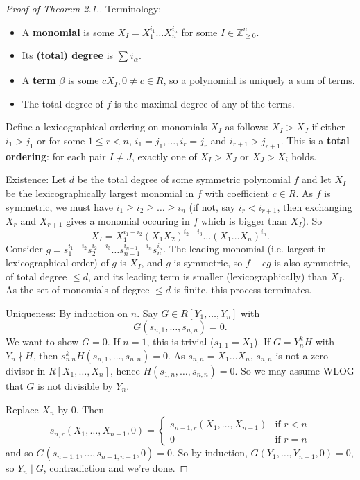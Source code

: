 \documentclass{article}
\theoremstyle{definition}
\begin{document}
\begin{proof}[Proof of Theorem 2.1.]
    Terminology:
    \begin{itemize}
        \item A \textbf{monomial} is some $X_{I} = X_1^{i_1}\ldots X_n^{i_n}$ for some $I \in \mathbb{Z}_{\ge 0}^n$.
        \item Its \textbf{(total) degree} is $\sum_{}^{} i_\alpha$.
        \item A \textbf{term} $\beta$ is some $c X_I, 0 \neq c \in R$, so a polynomial is uniquely a sum of terms.
        \item The total degree of $f$ is the maximal degree of any of the terms.
    \end{itemize}

    Define a lexicographical ordering on monomials $X_I$ as follows: $X_I > X_J$ if either $i_1 > j_1$ or for some $1 \le r < n$, $i_1=j_1,\ldots, i_r = j_r$ and $i_{r+1} > j_{r+1}$. This is a \textbf{total ordering}: for each pair $I \neq J$, exactly one of $X_I > X_J$ or $X_J > X_i$ holds.

    Existence: Let $d$ be the total degree of some symmetric polynomial $f$ and let $X_I$ be the lexicographically largest monomial in $f$ with coefficient $c \in R$. As $f$ is symmetric, we must have $i_1\ge i_2 \ge \ldots \ge i_n$ (if not, say $i_r < i_{r+1}$, then exchanging $X_r$ and $X_{r+1}$ gives a monomial occuring in $f$ which is bigger than $X_I$).
    So $$X_I = X_1^{i_1-i_2}(X_1X_2)^{i_2-i_3}\ldots(X_1\ldots X_n)^{i_n}.$$
    Consider $g = s_1^{i_1-i_2}s_2^{i_2-i_3}\ldots s_{n-1}^{i_{n-1}-i_n}s_n^{i_n}$. The leading monomial (i.e. largest in lexicographical order) of $g$ is $X_I$, and $g$ is symmetric, so $f-cg$ is also symmetric, of total degree $\le d$, and its leading term is smaller (lexicographically) than $X_I$. As the set of monomials of degree $\le d$ is finite, this process terminates.

    \vspace{1mm}

    Uniqueness: By induction on $n$. Say $G \in R[Y_1,\ldots,Y_n]$ with $$G(s_{n,1},\ldots,s_{n,n}) = 0.$$ We want to show $G = 0$. If $n=1$, this is trivial ($s_{1,1} = X_1$). If $G = Y_n^k H$ with $Y_n \nmid H$, then $s_{n.n}^k H(s_{n,1},\ldots,s_{n,n}) = 0$. As $s_{n,n} = X_1\ldots X_n$, $s_{n,n}$ is not a zero divisor in $R[X_1,\ldots,X_n]$, hence $H(s_{1,n},\ldots,s_{n,n}) = 0$. So we may assume WLOG that $G$ is not divisible by $Y_n$.

    Replace $X_n$ by 0. Then $$s_{n,r}(X_1,\ldots,X_{n-1},0) = \begin{cases}
        s_{n-1,r}(X_1, \ldots, X_{n-1}) &\text{if }r<n \\
        0 &\text{if } r=n
    \end{cases}$$
    and so $G(s_{n-1,1},\ldots,s_{n-1,n-1},0) = 0$. So by induction, $G(Y_1, \ldots, Y_{n-1}, 0) = 0$, so $Y_n \mid G$, contradiction and we're done.
\end{proof}
\end{document}
